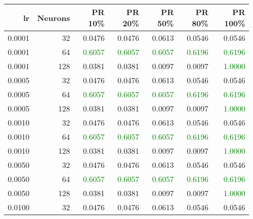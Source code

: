 \begin{tabular}{rrrrrrr}
\toprule
lr & Neurons & PR 10\% & PR 20\% & PR 50\% & PR 80\% & PR 100\% \\
\midrule
0.0001 & 32 & \textcolor{blu} {0.0476} & \textcolor{blu} {0.0476} & \textcolor{blu} {0.0613} & \textcolor{blu} {0.0546} & \textcolor{blu} {0.0546} \\
0.0001 & 64 & \textcolor{green} {0.6057} & \textcolor{green} {0.6057} & \textcolor{green} {0.6057} & \textcolor{green} {0.6196} & \textcolor{green} {0.6196} \\
0.0001 & 128 & \textcolor{blu} {0.0381} & \textcolor{blu} {0.0381} & \textcolor{blu} {0.0097} & \textcolor{blu} {0.0097} & \textcolor{green} {1.0000} \\
0.0005 & 32 & \textcolor{blu} {0.0476} & \textcolor{blu} {0.0476} & \textcolor{blu} {0.0613} & \textcolor{blu} {0.0546} & \textcolor{blu} {0.0546} \\
0.0005 & 64 & \textcolor{green} {0.6057} & \textcolor{green} {0.6057} & \textcolor{green} {0.6057} & \textcolor{green} {0.6196} & \textcolor{green} {0.6196} \\
0.0005 & 128 & \textcolor{blu} {0.0381} & \textcolor{blu} {0.0381} & \textcolor{blu} {0.0097} & \textcolor{blu} {0.0097} & \textcolor{green} {1.0000} \\
0.0010 & 32 & \textcolor{blu} {0.0476} & \textcolor{blu} {0.0476} & \textcolor{blu} {0.0613} & \textcolor{blu} {0.0546} & \textcolor{blu} {0.0546} \\
0.0010 & 64 & \textcolor{green} {0.6057} & \textcolor{green} {0.6057} & \textcolor{green} {0.6057} & \textcolor{green} {0.6196} & \textcolor{green} {0.6196} \\
0.0010 & 128 & \textcolor{blu} {0.0381} & \textcolor{blu} {0.0381} & \textcolor{blu} {0.0097} & \textcolor{blu} {0.0097} & \textcolor{green} {1.0000} \\
0.0050 & 32 & \textcolor{blu} {0.0476} & \textcolor{blu} {0.0476} & \textcolor{blu} {0.0613} & \textcolor{blu} {0.0546} & \textcolor{blu} {0.0546} \\
0.0050 & 64 & \textcolor{green} {0.6057} & \textcolor{green} {0.6057} & \textcolor{green} {0.6057} & \textcolor{green} {0.6196} & \textcolor{green} {0.6196} \\
0.0050 & 128 & \textcolor{blu} {0.0381} & \textcolor{blu} {0.0381} & \textcolor{blu} {0.0097} & \textcolor{blu} {0.0097} & \textcolor{green} {1.0000} \\
0.0100 & 32 & \textcolor{blu} {0.0476} & \textcolor{blu} {0.0476} & \textcolor{blu} {0.0613} & \textcolor{blu} {0.0546} & \textcolor{blu} {0.0546} \\

\end{tabular}
